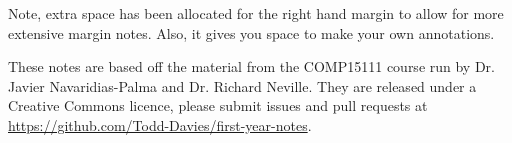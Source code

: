 \documentclass{article}
\begin{document}


\rhead{\Title}
\chead{}

\maketitle

{\small Note, extra space has been allocated for the right hand margin to allow
for more extensive margin notes. Also, it gives you space to make your own
annotations.}

{\small These notes are based off the material from the COMP15111 course run by 
Dr. Javier Navaridias-Palma and Dr. Richard Neville. They are released
under a Creative Commons licence, please submit issues and pull requests at
\url{https://github.com/Todd-Davies/first-year-notes}.}

\tableofcontents
\newpage


\end{document}
